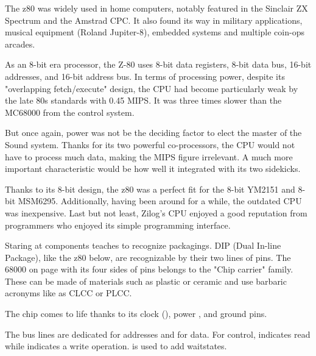 The z80 was widely used in home computers, notably featured in the Sinclair ZX Spectrum and the Amstrad CPC. It also found its way in military applications, musical equipment (Roland Jupiter-8), embedded systems and multiple coin-ops arcades. 

As an 8-bit era processor, the Z-80 uses 8-bit data registers, 8-bit data bus, 16-bit addresses, and 16-bit address bus. In terms of processing power, despite its "overlapping fetch/execute" design, the CPU had become particularly weak by the late 80s standards with 0.45 MIPS. It was three times slower than the MC68000 from the control system\cite{mips}. 


But once again, power was not be the deciding factor to elect the master of the Sound system. Thanks for its two powerful co-processors, the CPU would not have to process much data, making the MIPS figure irrelevant. A much more important characteristic would be how well it integrated with its two sidekicks.

Thanks to its 8-bit design, the z80 was a perfect fit for the 8-bit YM2151 and 8-bit MSM6295. Additionally, having been around for a while, the outdated CPU was inexpensive. Last but not least, Zilog's CPU enjoyed a good reputation from programmers who enjoyed its simple programming interface.

\begin{trivia}
Staring at components teaches to recognize packagings. DIP (Dual In-line Package), like the z80 below, are recognizable by their two lines of pins. The 68000 on page \pageref{68000drawing} with its four sides of pins belongs to the "Chip carrier" family. These can be made of materials such as plastic or ceramic and use barbaric acronyms like as CLCC or PLCC.  
\end{trivia}




The chip comes to life thanks to its clock (), power , and ground  pins.

The bus lines are dedicated  for addresses and  for data. For control,  indicates read while  indicates a write operation.  is used to add waitstates. 


